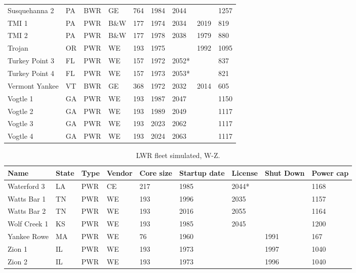 \begin{table}[H]
\begin{tabular}{l l l l l l l l l}
    Susquehanna 2       & PA & BWR & GE   & 764 & 1984 & 2044 &      & 1257 \\
    TMI 1               & PA & PWR & B\&W & 177 & 1974 & 2034 & 2019 & 819 \\
    TMI 2               & PA & PWR & B\&W & 177 & 1978 & 2038 & 1979 & 880 \\
    Trojan              & OR & PWR & WE   & 193 & 1975 &      & 1992 & 1095 \\
    Turkey Point 3      & FL & PWR & WE   & 157 & 1972 & 2052*&      & 837 \\
    Turkey Point 4      & FL & PWR & WE   & 157 & 1973 & 2053*&      & 821 \\
    Vermont Yankee      & VT & BWR & GE   & 368 & 1972 & 2032 & 2014 & 605 \\
    Vogtle 1            & GA & PWR & WE   & 193 & 1987 & 2047 &      & 1150 \\
    Vogtle 2            & GA & PWR & WE   & 193 & 1989 & 2049 &      & 1117 \\
    Vogtle 3            & GA & PWR & WE   & 193 & 2023 & 2062 &      & 1117 \\
    Vogtle 4            & GA & PWR & WE   & 193 & 2024 & 2063 &      & 1117 \\
    \hline
    \end{tabular}
\end{table}

\begin{table}[H]
    \centering
    \caption{LWR fleet simulated, W-Z.}
    \label{tab:lwr_fleet5}
    \begin{tabular}{l l l l l l l l l}
    \hline
    \textbf{Name} & \textbf{State} & \textbf{Type} & \textbf{Vendor} & \textbf{Core size} & \textbf{Startup date} & \textbf{License} & \textbf{Shut Down} & \textbf{Power cap} \\
    \hline
    Waterford 3         & LA & PWR & CE   & 217 & 1985 & 2044*&      & 1168 \\
    Watts Bar 1         & TN & PWR & WE   & 193 & 1996 & 2035 &      & 1157 \\
    Watts Bar 2         & TN & PWR & WE   & 193 & 2016 & 2055 &      & 1164 \\
    Wolf Creek 1        & KS & PWR & WE   & 193 & 1985 & 2045 &      & 1200 \\
    Yankee Rowe         & MA & PWR & WE   & 76  & 1960 &      & 1991 & 167 \\
    Zion 1              & IL & PWR & WE   & 193 & 1973 &      & 1997 & 1040 \\
    Zion 2              & IL & PWR & WE   & 193 & 1973 &      & 1996 & 1040 \\
    \hline
    \end{tabular}
\end{table}
